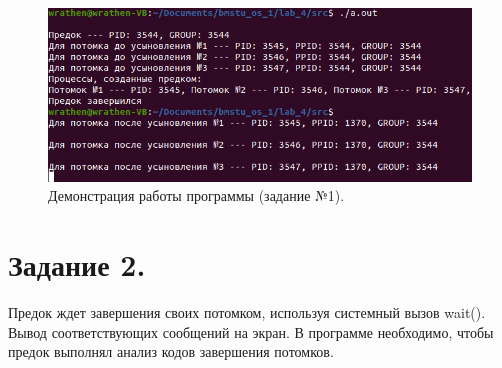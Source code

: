\documentclass[12pt]{report}
\begin{document}
	\begin{figure}[H]
		
		\centering
		
		\includegraphics[width=\linewidth]{img/task_01.png}
		\caption{Демонстрация работы программы (задание №1).}
		
		\label{fig:task_01}
		
	\end{figure}

	\section*{Задание 2.}
	Предок ждет завершения своих потомком, используя системный вызов wait().
	Вывод соответствующих сообщений на экран.
	В программе необходимо, чтобы предок выполнял анализ кодов завершения потомков.
	
\end{document}
